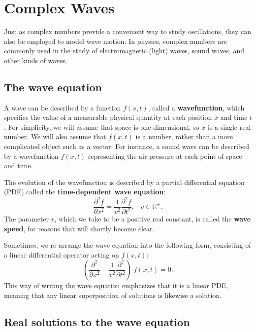 \documentclass[10pt,a4paper]{article}
\begin{document}
\setcounter{page}{40}

\section{Complex Waves}
\label{complex-waves}

Just as complex numbers provide a convenient way to study
oscillations, they can also be employed to model wave motion. In
physics, complex numbers are commonly used in the study of
electromagnetic (light) waves, sound waves, and other kinds of waves.


\subsection{The wave equation}
\label{the-wave-equation}

A wave can be described by a function $f(x,t)$, called a
\textbf{wavefunction}, which specifies the value of a measurable
physical quantity at each position $x$ and time $t$. For simplicity,
we will assume that space is one-dimensional, so $x$ is a single real
number. We will also assume that $f(x,t)$ is a number, rather than a
more complicated object such as a vector. For instance, a sound wave
can be described by a wavefunction $f(x,t)$ representing the air
pressure at each point of space and time.

The evolution of the wavefunction is described by a partial
differential equation (PDE) called the \textbf{time-dependent wave
  equation}:
\begin{equation}
\frac{\partial^2 f}{\partial x^2} = \frac{1}{v^2} \frac{\partial^2 f}{\partial t^2}, \;\;\; v \in\mathbb{R}^+.
\end{equation}
The parameter $v$, which we take to be a positive real constant, is
called the \textbf{wave speed}, for reasons that will shortly become
clear.

Sometimes, we re-arrange the wave equation into the following form,
consisting of a linear differential operator acting on $f(x,t)$:
\begin{equation}
\left(\frac{\partial^2}{\partial x^2} - \frac{1}{v^2} \frac{\partial^2}{\partial t^2}\right) \; f(x,t) = 0.
\end{equation}
This way of writing the wave equation emphasizes that it is a linear
PDE, meaning that any linear superposition of solutions is likewise a
solution.

\subsection{Real solutions to the wave equation}
\label{real-solutions-to-the-wave-equation}
\end{document}
